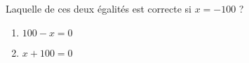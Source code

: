
\begin{mental}
    Laquelle de ces deux égalités est correcte si \( x=-100\) ?

    \begin{enumerate}
        \item
    $100-x=0$
\item
    $x+100=0$
    \end{enumerate}
\end{mental}

